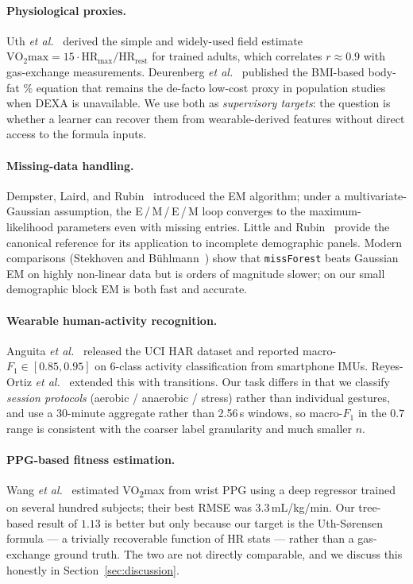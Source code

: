 \documentclass[sigconf,nonacm]{acmart}
\begin{document}
\paragraph{Physiological proxies.}
Uth \emph{et al.}~\cite{uth} derived the simple and widely-used field
estimate
$\mathrm{VO}_{2}\mathrm{max}=15\cdot\mathrm{HR}_{\max}/\mathrm{HR}_{\mathrm{rest}}$
for trained adults, which correlates $r\approx 0.9$ with gas-exchange
measurements. Deurenberg \emph{et al.}~\cite{deurenberg} published the
BMI-based body-fat \% equation that remains the de-facto low-cost
proxy in population studies when DEXA is unavailable. We use both as
\emph{supervisory targets}: the question is whether a learner can
recover them from wearable-derived features without direct access to
the formula inputs.

\paragraph{Missing-data handling.}
Dempster, Laird, and Rubin~\cite{dempster1977} introduced the EM
algorithm; under a multivariate-Gaussian assumption, the
E\,/\,M\,/\,E\,/\,M loop converges to the maximum-likelihood
parameters even with missing entries. Little and
Rubin~\cite{littlerubin} provide the canonical reference for its
application to incomplete demographic panels. Modern comparisons
(Stekhoven and B\"uhlmann~\cite{missforest}) show that
\texttt{missForest} beats Gaussian EM on highly non-linear data but
is orders of magnitude slower; on our small demographic block EM is
both fast and accurate.

\paragraph{Wearable human-activity recognition.}
Anguita \emph{et al.}~\cite{anguita2013} released the UCI HAR dataset
and reported macro-$F_{1}\in[0.85,0.95]$ on 6-class activity
classification from smartphone IMUs. Reyes-Ortiz
\emph{et al.}~\cite{reyes2016} extended this with transitions.
Our task differs in that we classify \emph{session protocols}
(aerobic / anaerobic / stress) rather than individual gestures, and
use a 30-minute aggregate rather than 2.56\,s windows, so macro-$F_{1}$
in the $0.7$ range is consistent with the coarser label granularity
and much smaller $n$.

\paragraph{PPG-based fitness estimation.}
Wang \emph{et al.}~\cite{ppgvo2} estimated VO\textsubscript{2}max
from wrist PPG using a deep regressor trained on several hundred
subjects; their best RMSE was $3.3$\,mL/kg/min. Our tree-based result
of $1.13$ is better but only because our target is the
Uth-S{\o}rensen formula --- a trivially recoverable function of HR
stats --- rather than a gas-exchange ground truth. The two are not
directly comparable, and we discuss this honestly in
Section~\ref{sec:discussion}.
\end{document}
